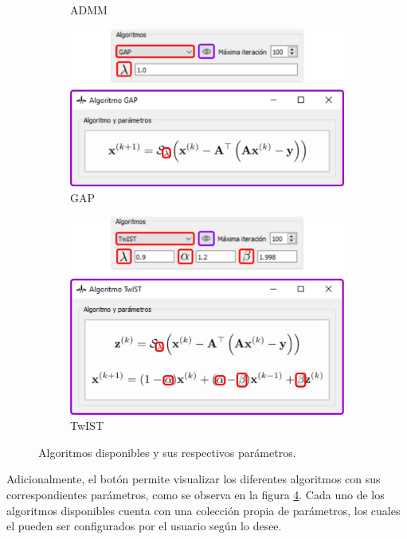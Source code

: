 \documentclass[12pt,twoside,letter]{ol-softwaremanual}
\begin{document}
\begin{figure}[!ht]
\begin{subfigure}[b]{0.47\textwidth}
         \caption{ADMM}
         \label{fig:admm}
     \end{subfigure}
     \begin{subfigure}[b]{0.47\textwidth}
         \centering
         \includegraphics[width=\textwidth]{algorithm-gap.png}
         \caption{GAP}
         \label{fig:gap}
     \end{subfigure}
     \hfill
     \begin{subfigure}[b]{0.47\textwidth}
         \centering
         \includegraphics[width=\textwidth]{algorithm-twist.png}
         \caption{TwIST}
         \label{fig:twist}
     \end{subfigure}
        \caption{Algoritmos disponibles y sus respectivos parámetros.}
        \label{fig:algorithms}
\end{figure}

Adicionalmente, el botón\hspace{0.5mm} \faEye \hspace{0.5mm} permite visualizar los diferentes algoritmos con sus correspondientes parámetros, como se observa en la figura \ref{fig:algorithms}. Cada uno de los algoritmos disponibles cuenta con una colección propia de parámetros, los cuales el pueden ser configurados por el usuario según lo desee.
\end{document}
